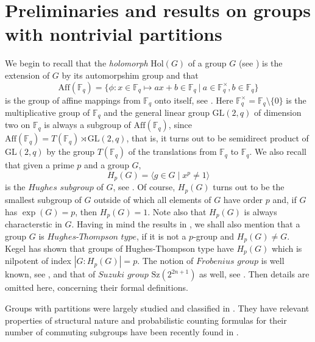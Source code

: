 \documentclass{amsart}
\theoremstyle{definition}
\numberwithin{equation}{section}
\begin{document}
\section{Preliminaries and results on groups with nontrivial partitions}

We begin to recall that the  \textit{holomorph} $\mathrm{Hol}(G)$ of a group $G$ (see \cite{huppert}) is the extension of $G$ by its automorpshim group and that \begin{equation}\mathrm{Aff}(\mathbb{F}_q)= \{ \phi : x \in \mathbb{F}_q \mapsto ax + b \in \mathbb{F}_q  \ | \ a \in \mathbb{F}^\times_q, b \in \mathbb{F}_q  \} 
\end{equation} is the  group of affine mappings from  $\mathbb{F}_q$ onto itself, see \cite[Kapitel V, Beispiele 8.6]{huppert}. Here  $\mathbb{F}^\times_q= \mathbb{F}_q \setminus\{0\}$ is the multiplicative group of  $\mathbb{F}_q$ and the general linear group $\mathrm{GL}(2,q)$ of dimension two on $\mathbb{F}_q$ is always a subgroup of $\mathrm{Aff}(\mathbb{F}_q)$, since $\mathrm{Aff}(\mathbb{F}_q)=T(\mathbb{F}_q) \rtimes \mathrm{GL}(2,q)$, that is, it turns out to be  semidirect product of $\mathrm{GL}(2,q)$ by the group $T(\mathbb{F}_q)$ of the translations from $\mathbb{F}_q$ to $\mathbb{F}_q$. %
We also recall that given a prime $p$ and a group $G$, \begin{equation}H_p(G)=\langle g \in G \mid x^p \neq 1\rangle
\end{equation} is the $Hughes$ $subgroup$ of  $G$, see \cite{kegel2}. Of course, $H_p(G)$ turns out to be the smallest subgroup of $G$ outside of which all elements of $G$ have order $p$ and, if $G$ has $\exp(G)=p$, then $H_p(G)=1$. Note also that $H_p(G)$ is always characterstic in $G$. Having in mind the results in \cite[Kapitel V, \S 8]{huppert}, we shall also mention that a group $G$ is  $Hughes$-$Thompson$ $type$, if it is not a $p$-group and $H_p(G) \neq G$. Kegel \cite{kegel2} has shown that groups of Hughes-Thompson type have  $H_p(G)$ which is nilpotent of index $|G : H_p(G)| = p$. The notion of $Frobenius$ $group$ is well known, see \cite[Kapitel V, \S 8, Definition 8.1]{huppert},  and that of $Suzuki$ $group$ $\mathrm{Sz}(2^{2n+1})$ as well, see \cite[Kapitel II \S 10, Bemerkung 10.15]{huppert}. Then details are omitted here, concerning their formal definitions. 


Groups with partitions were largely studied and classified in \cite{baer1, baer2, kegel1, kegel2, kegel3, kont, suzuki}. They have relevant properties of structural nature and probabilistic counting formulas for their number of commuting subgroups have been recently found in \cite{seidnew}.
\end{document}
